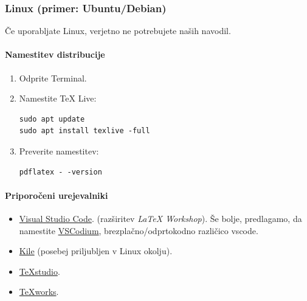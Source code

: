 \subsubsection{Linux (primer: Ubuntu/Debian)}

Če uporabljate Linux, verjetno ne potrebujete naših navodil.

\paragraph{Namestitev distribucije}

\begin{enumerate}
\item Odprite Terminal.
\item Namestite TeX Live:

\begin{verbatim}
sudo apt update
sudo apt install texlive -full
\end{verbatim}


\item Preverite namestitev:

\begin{verbatim}
pdflatex - -version
\end{verbatim}
\end{enumerate}

\paragraph{Priporočeni urejevalniki}

\begin{itemize}
\item \href{https://code.visualstudio.com/}{Visual Studio Code}. (razširitev \textit{LaTeX Workshop}). Še bolje, predlagamo, da namestite \href{https://vscodium.com/}{VSCodium}, brezplačno/odprtokodno različico vscode.
\item \href{https://kile.sourceforge.io/}{Kile} (posebej priljubljen v Linux okolju).
\item \href{https://www.texstudio.org/}{TeXstudio}.
\item \href{https://www.tug.org/texworks/}{TeXworks}.
\end{itemize}